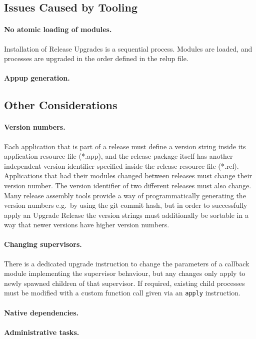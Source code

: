 \subsection{Issues Caused by Tooling}

\paragraph{No atomic loading of modules.}
Installation of Release Upgrades is a sequential process. Modules are loaded, and processes are upgraded in the order defined in the \acrshort{relup} file.

\paragraph{Appup generation.}
%

\subsection{Other Considerations}

\paragraph{Version numbers.}
Each application that is part of a release must define a version string inside its application resource file (*.app), and the release package itself has another independent version identifier specified inside the release resource file (*.rel). Applications that had their modules changed between releases must change their version number. The version identifier of two different releases must also change. Many release assembly tools provide a way of programmatically generating the version numbers e.g.~by using the git commit hash, but in order to successfully apply an Upgrade Release the version strings must additionally be sortable in a way that newer versions have higher version numbers.


\paragraph{Changing supervisors.}
There is a dedicated upgrade instruction to change the parameters of a callback module implementing the supervisor behaviour, but any changes only apply to newly spawned children of that supervisor. If required, existing child processes must be modified with a custom function call given via an \lstinline|apply| instruction.

\paragraph{Native dependencies.}

\paragraph{Administrative tasks.}
